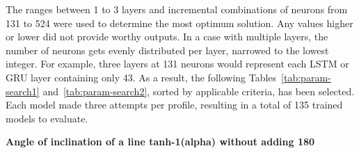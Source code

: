 %
The ranges between 1 to 3 layers and incremental combinations of neurons from 131 to 524 were used to determine the most optimum solution.
Any values higher or lower did not provide worthy outputs.
In a case with multiple layers, the number of neurons gets evenly distributed per layer, narrowed to the lowest integer.
For example, three layers at 131 neurons would represent each LSTM or GRU layer containing only 43.
As a result, the following Tables~\ref{tab:param-search1} and~\ref{tab:param-search2}, sorted by applicable criteria, has been selected.
Each model made three attempts per profile, resulting in a total of 135 trained models to evaluate.

%
%
\textbf{Angle of inclination of a line tanh-1(alpha) without adding 180 }
\begin{table}[htbp]
  \renewcommand{\arraystretch}{1.3}
  \caption{Hyper-params selection - Sorted by Average MAE}
  \centering
  \label{tab:param-search1}
\end{table}
